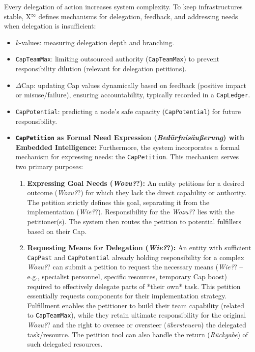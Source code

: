 \documentclass[12pt, a4paper]{scrartcl}
\newcommand{\Xinf}{X$^\infty$}                        %
\newcommand{\DeltaCap}{$\Delta$Cap}                    %
\newcommand{\CapPotential}{\texttt{CapPotential}}    %
\newcommand{\CapPast}{\texttt{CapPast}}              %
\newcommand{\CapTeamMax}{\texttt{CapTeamMax}}        %
\newcommand{\CapLedger}{\texttt{CapLedger}}          %
\newcommand{\CapPetition}{\texttt{CapPetition}}        %
\newcommand{\Wozu}{\textit{Wozu?}}                      %
\newcommand{\Wie}{\textit{Wie?}}                        %
\begin{document}
Every delegation of action increases system complexity. To keep infrastructures stable, \Xinf{} defines mechanisms for delegation, feedback, and addressing needs when delegation is insufficient:
\begin{itemize}
    \item $k$-values: measuring delegation depth and branching.
    \item \CapTeamMax{}: limiting outsourced authority (\CapTeamMax{}) to prevent responsibility dilution (relevant for delegation petitions).
    \item \DeltaCap{}: updating Cap values dynamically based on feedback (positive impact or misuse/failure), ensuring accountability, typically recorded in a \CapLedger{}.
    \item \CapPotential{}: predicting a node’s safe capacity (\CapPotential{}) for future responsibility.
    \item \textbf{\CapPetition{} as Formal Need Expression (\textit{Bedürfnisäußerung}) with Embedded Intelligence:} Furthermore, the system incorporates a formal mechanism for expressing needs: the \CapPetition{}. This mechanism serves two primary purposes:
        \begin{enumerate}[label=(\alph*)]
            \item \textbf{Expressing Goal Needs (\Wozu?):} An entity petitions for a desired outcome (\Wozu?) for which they lack the direct capability or authority. The petition strictly defines this goal, separating it from the implementation (\Wie?). Responsibility for the \Wozu? lies with the petitioner(s). The system then routes the petition to potential fulfillers based on their Cap.
            \item \textbf{Requesting Means for Delegation (\Wie?):} An entity with sufficient \CapPast{} and \CapPotential{} already holding responsibility for a complex \Wozu? can submit a petition to request the necessary means (\Wie? – e.g., specialist personnel, specific resources, temporary Cap boost) required to effectively delegate parts of *their own* task. This petition essentially requests components for their implementation strategy. Fulfillment enables the petitioner to build their team capability (related to \CapTeamMax{}), while they retain ultimate responsibility for the original \Wozu? and the right to oversee or oversteer (\textit{übersteuern}) the delegated task/resource. The petition tool can also handle the return (\textit{Rückgabe}) of such delegated resources.

\end{enumerate}
\end{itemize}
\end{document}
